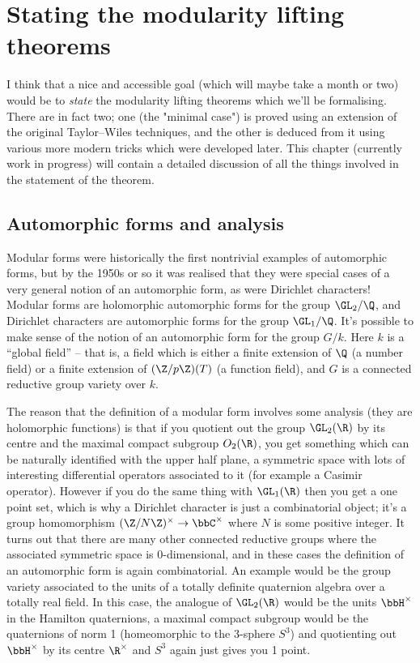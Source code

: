 \chapter{Stating the modularity lifting theorems}

I think that a nice and accessible goal (which will maybe take a month or two) would be to
\emph{state} the modularity lifting theorems which we'll be formalising. There are in fact two;
one (the "minimal case") is proved using an extension of the original Taylor--Wiles techniques, and
the other is deduced from it using various more modern tricks which were developed later. This
chapter (currently work in progress) will contain a detailed discussion of all the things
involved in the statement of the theorem.

\section{Automorphic forms and analysis}

Modular forms were historically the first nontrivial examples of automorphic forms, but by the
1950s or so it was realised that they were special cases of a very general notion of an automorphic
form, as were Dirichlet characters! Modular forms are holomorphic automorphic forms for the group
$\GL_2/\Q$, and Dirichlet characters are automorphic forms for the group $\GL_1/\Q$. It's possible
to make sense of the notion of an automorphic form for the group $G/k$. Here $k$ is
a ``global field'' -- that is, a field which is either a finite extension of $\Q$ (a number field)
or a finite extension of $(\Z/p\Z)(T)$ (a function field), and $G$ is a connected reductive
group variety over $k$.

The reason that the definition of a modular form involves some analysis (they are holomorphic
functions) is that if you quotient out the group $\GL_2(\R)$ by its centre and the maximal compact
subgroup $O_2(\R)$, you get something which can be naturally identified with the upper half plane, a
symmetric space with lots of interesting differential operators associated to it (for example a
Casimir operator). However if you do the same thing with $\GL_1(\R)$ then you get a one point set,
which is why a Dirichlet character is just a combinatorial object; it's a group homomorphism
$(\Z/N\Z)^\times\to\bbC^\times$ where $N$ is some positive integer. It turns out that there are many
other connected reductive groups where the associated symmetric space is 0-dimensional, and in these
cases the definition of an automorphic form is again combinatorial. An example would be the group
variety associated to the units of a totally definite quaternion algebra over a totally real field.
In this case, the analogue of $\GL_2(\R)$ would be the units $\bbH^\times$ in the Hamilton
quaternions, a maximal compact subgroup would be the quaternions of norm 1 (homeomorphic to the
3-sphere $S^3$) and quotienting out $\bbH^\times$ by its centre $\R^\times$ and $S^3$ again just
gives you 1 point.

